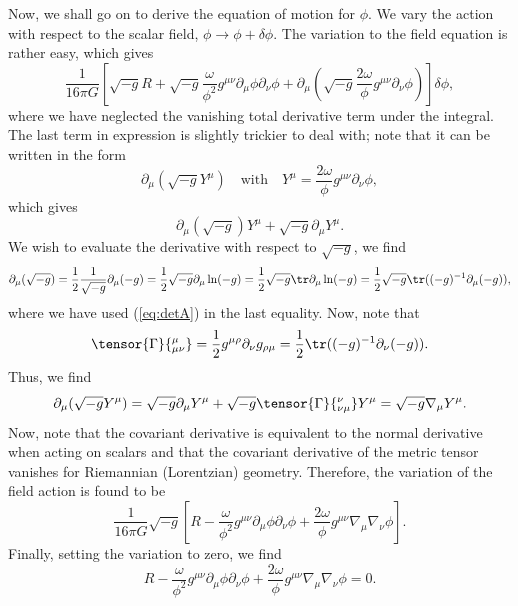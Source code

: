 \begin{solution}
    Now, we shall go on to derive the equation of motion for $\phi$. We vary the action with respect to the scalar field, $\phi \to \phi + \delta \phi$. The variation to the field equation is rather easy, which gives
    \begin{equation}
        \frac{1}{16\pi G}\left[\sqrt{-g}R +\sqrt{-g}\frac{\omega}{\phi^2}g^{\mu\nu}\partial_\mu\phi\partial_\nu\phi +\partial_\mu\left(\sqrt{-g}\frac{2\omega}{\phi}g^{\mu\nu}\partial_\nu\phi\right)\right]\delta\phi,
    \end{equation}
    where we have neglected the vanishing total derivative term under the integral. The last term in expression is slightly trickier to deal with; note that
    it can be written in the form
    \begin{equation}
        \partial_\mu(\sqrt{-g}Y^\mu) \quad \text{with} \quad Y^\mu = \frac{2\omega}{\phi}g^{\mu\nu}\partial_\nu\phi,
    \end{equation}
    which gives 
    \begin{equation}
        \partial_\mu(\sqrt{-g})Y^\mu + \sqrt{-g}\partial_\mu Y^\mu.
    \end{equation}
    We wish to evaluate the derivative with respect to $\sqrt{-g}$, we find
    \begin{equation}
        \partial_\mu(\sqrt{-g}) = \frac{1}{2}\frac{1}{\sqrt{-g}}\partial_\mu(-g) = \frac{1}{2}\sqrt{-g}\partial_\mu\ln(-g) = \frac{1}{2}\sqrt{-g}\tr\partial_\mu\ln(-g) = \frac{1}{2}\sqrt{-g}\tr((-g)^{-1}\partial_\mu(-g)),
    \end{equation}
    where we have used (\ref{eq:detA}) in the last equality. Now, note that 
    \begin{equation}
        \tensor{\Gamma}{^\mu_{\mu\nu}}= \frac{1}{2}g^{\mu\rho}\partial_\nu g_{\rho\mu} = \frac{1}{2}\tr((-g)^{-1}\partial_\nu(-g)).
    \end{equation}
    Thus, we find
    \begin{equation}
        \partial_\mu(\sqrt{-g}Y^\mu) = \sqrt{-g}\partial_\mu Y^\mu + \sqrt{-g}\tensor{\Gamma}{^\nu_{\nu\mu}}Y^\mu = \sqrt{-g}\nabla_\mu Y^\mu.
    \end{equation}
    Now, note that the covariant derivative is equivalent to the normal derivative when acting on scalars and that the covariant derivative of the metric tensor vanishes for Riemannian (Lorentzian) geometry. Therefore, the variation of the field action is found to be
    \begin{equation}
        \frac{1}{16\pi G}\sqrt{-g}\left[R - \frac{\omega}{\phi^2}g^{\mu\nu}\partial_\mu\phi\partial_\nu\phi +\frac{2\omega}{\phi}g^{\mu\nu}\nabla_\mu\nabla_\nu\phi\right].
    \end{equation}
    Finally, setting the variation to zero, we find
    \begin{equation}
    \boxed{
        R - \frac{\omega}{\phi^2}g^{\mu\nu}\partial_\mu\phi\partial_\nu\phi +\frac{2\omega}{\phi}g^{\mu\nu}\nabla_\mu\nabla_\nu\phi = 0.}
    \end{equation}
    
\end{solution}